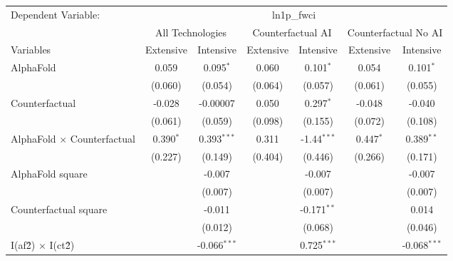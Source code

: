 \begingroup
\centering
\begin{tabular}{lcccccc}
   \tabularnewline \midrule \midrule
   Dependent Variable: & \multicolumn{6}{c}{ln1p\_fwci}\\
 & \multicolumn{2}{c}{All Technologies} & \multicolumn{2}{c}{Counterfactual AI} & \multicolumn{2}{c}{Counterfactual No AI} \\
\cmidrule(lr){1-1}\cmidrule(lr){2-3} \cmidrule(lr){4-5} \cmidrule(lr){6-7}
Variables & \multicolumn{1}{c}{Extensive} & \multicolumn{1}{c}{Intensive} & \multicolumn{1}{c}{Extensive} & \multicolumn{1}{c}{Intensive} & \multicolumn{1}{c}{Extensive} & \multicolumn{1}{c}{Intensive} \\
\cmidrule(lr){1-1}\cmidrule(lr){2-2} \cmidrule(lr){3-3} \cmidrule(lr){4-4} \cmidrule(lr){5-5} \cmidrule(lr){6-6} \cmidrule(lr){7-7}
   AlphaFold                          & 0.059       & 0.095$^{*}$    & 0.060   & 0.101$^{*}$   & 0.054       & 0.101$^{*}$\\   
                                      & (0.060)     & (0.054)        & (0.064) & (0.057)       & (0.061)     & (0.055)\\   
   Counterfactual                     & -0.028      & -0.00007       & 0.050   & 0.297$^{*}$   & -0.048      & -0.040\\   
                                      & (0.061)     & (0.059)        & (0.098) & (0.155)       & (0.072)     & (0.108)\\   
   AlphaFold $\times$ Counterfactual  & 0.390$^{*}$ & 0.393$^{***}$  & 0.311   & -1.44$^{***}$ & 0.447$^{*}$ & 0.389$^{**}$\\   
                                      & (0.227)     & (0.149)        & (0.404) & (0.446)       & (0.266)     & (0.171)\\   
   AlphaFold square                   &             & -0.007         &         & -0.007        &             & -0.007\\   
                                      &             & (0.007)        &         & (0.007)       &             & (0.007)\\   
   Counterfactual square              &             & -0.011         &         & -0.171$^{**}$ &             & 0.014\\   
                                      &             & (0.012)        &         & (0.068)       &             & (0.046)\\   
   I(af\^2) $\times$ I(ct\^2)         &             & -0.066$^{***}$ &         & 0.725$^{***}$ &             & -0.068$^{***}$\\   

\end{tabular}
